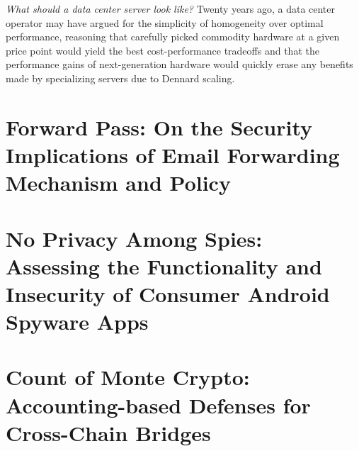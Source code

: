 \documentclass[12pt]{ucsddissertation}
\begin{document}
\mainmatter

\begin{dissertationintroduction}


\textit{What should a data center server look like?} Twenty years ago, a data center operator may
have argued for the simplicity of homogeneity over optimal performance, reasoning that carefully
picked commodity hardware at a given price point would yield the best cost-performance tradeoffs and that the
performance gains of next-generation hardware would quickly erase any benefits made by specializing
servers due to Dennard scaling.

\end{dissertationintroduction}



\chapter{Forward Pass: On the Security Implications of Email Forwarding Mechanism and Policy}
\label{chap:eurosp23}









\chapter{No Privacy Among Spies: Assessing the Functionality and Insecurity of Consumer Android Spyware Apps}
\label{chap:pets23}









\chapter{Count of Monte Crypto: Accounting-based Defenses for Cross-Chain Bridges}
\label{chap:bridge}












\end{document}
